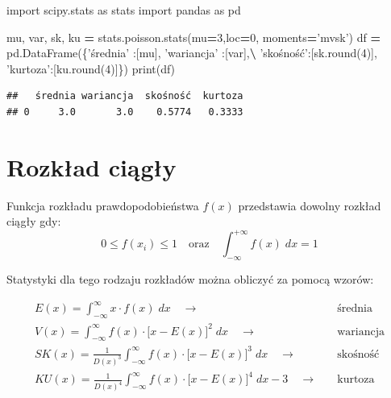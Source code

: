 \documentclass[polish,]{book}
\newenvironment{Shaded}{\begin{snugshade}}{\end{snugshade}}
\newcommand{\BuiltInTok}[1]{#1}
\newcommand{\DecValTok}[1]{\textcolor[rgb]{0.00,0.00,0.81}{#1}}
\newcommand{\ImportTok}[1]{#1}
\newcommand{\NormalTok}[1]{#1}
\newcommand{\OperatorTok}[1]{\textcolor[rgb]{0.81,0.36,0.00}{\textbf{#1}}}
\newcommand{\StringTok}[1]{\textcolor[rgb]{0.31,0.60,0.02}{#1}}
\begin{document}
\begin{Shaded}
\begin{Highlighting}[]
\ImportTok{import}\NormalTok{ scipy.stats }\ImportTok{as}\NormalTok{ stats}
\ImportTok{import}\NormalTok{ pandas }\ImportTok{as}\NormalTok{ pd}

\NormalTok{mu, var, sk, ku }\OperatorTok{=}\NormalTok{ stats.poisson.stats(mu}\OperatorTok{=}\DecValTok{3}\NormalTok{,loc}\OperatorTok{=}\DecValTok{0}\NormalTok{, moments}\OperatorTok{=}\StringTok{'mvsk'}\NormalTok{)}
\NormalTok{df }\OperatorTok{=}\NormalTok{ pd.DataFrame(\{}\StringTok{'średnia'}\NormalTok{ :[mu], }\StringTok{'wariancja'}\NormalTok{ :[var],}\OperatorTok{\textbackslash{}}
                   \StringTok{'skośność'}\NormalTok{:[sk.}\BuiltInTok{round}\NormalTok{(}\DecValTok{4}\NormalTok{)], }\StringTok{'kurtoza'}\NormalTok{:[ku.}\BuiltInTok{round}\NormalTok{(}\DecValTok{4}\NormalTok{)]\})}
\BuiltInTok{print}\NormalTok{(df)}
\end{Highlighting}
\end{Shaded}

\begin{verbatim}
##   średnia wariancja  skośność  kurtoza
## 0     3.0       3.0    0.5774   0.3333
\end{verbatim}

\hypertarget{R12}{%
\section{Rozkład ciągły}\label{R12}}

Funkcja rozkładu prawdopodobieństwa \(f(x)\) przedstawia dowolny rozkład ciągły gdy:
\begin{equation}
0\leq f(x_i)\leq1\quad\textrm{oraz}\quad \int_{-\infty}^{+\infty}f(x)\;dx=1
\label{eq:prob02}
\end{equation}

Statystyki dla tego rodzaju rozkładów można obliczyć za pomocą wzorów:

\begin{align}
E(x)=\int_{-\infty}^{\infty}x\cdot f(x)\; dx \quad\longrightarrow\quad
&
\textrm{średnia} \label{eq:Ec}\\[2.5pt]
V(x)=\int_{-\infty}^{\infty} f(x)\cdot\big[x-E(x)\big]^2\; dx \quad\longrightarrow\quad
&
\textrm{wariancja} \label{eq:Vc}\\[2.5pt]
SK(x)=\frac{1}{D(x)^3}\int_{-\infty}^{\infty} f(x)\cdot\big[x-E(x)\big]^3\; dx \quad\longrightarrow\quad
&
\textrm{skośność} \label{eq:Sc}\\[2.5pt]
KU(x)=\frac{1}{D(x)^4}\int_{-\infty}^{\infty}  f(x)\cdot\big[x-E(x)\big]^4\; dx-3 \quad\longrightarrow\quad
&
\textrm{kurtoza} \label{eq:Kc}
\end{align}
\end{document}
